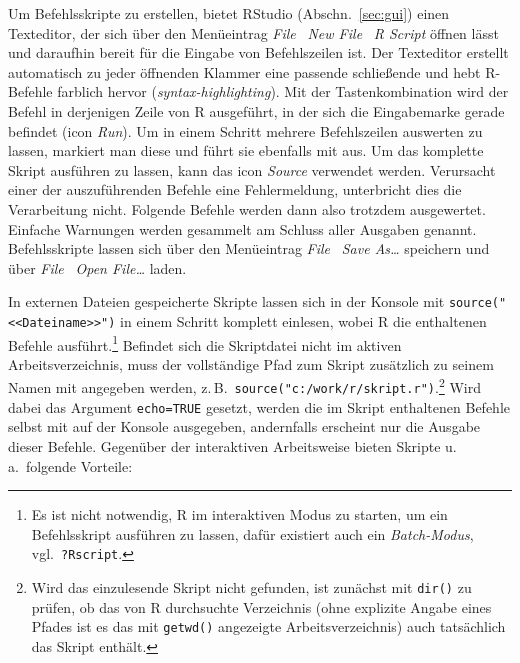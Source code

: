 Um Befehlsskripte zu erstellen, bietet RStudio (Abschn.\ \ref{sec:gui}) einen Texteditor, der sich über den Menüeintrag \emph{File} \textrightarrow\ \emph{New File} \textrightarrow\ \emph{R Script} öffnen lässt und daraufhin bereit für die Eingabe von Befehlszeilen ist. Der Texteditor erstellt automatisch zu jeder öffnenden Klammer eine passende schließende und hebt R-Befehle farblich hervor (\emph{syntax-highlighting}). Mit der Tastenkombination  wird der Befehl in derjenigen Zeile von R ausgeführt, in der sich die Eingabemarke gerade befindet (icon \emph{Run}). Um in einem Schritt mehrere Befehlszeilen auswerten zu lassen, markiert man diese und führt sie ebenfalls mit  aus. Um das komplette Skript ausführen zu lassen, kann das icon \emph{Source} verwendet werden. Verursacht einer der auszuführenden Befehle eine Fehlermeldung, unterbricht dies die Verarbeitung nicht. Folgende Befehle werden dann also trotzdem ausgewertet. Einfache Warnungen werden gesammelt am Schluss aller Ausgaben genannt. Befehlsskripte lassen sich über den Menüeintrag \emph{File} \textrightarrow\ \emph{Save As\ldots} speichern und über \emph{File} \textrightarrow\ \emph{Open File\ldots} laden.

In externen Dateien gespeicherte Skripte lassen sich in der Konsole mit \lstinline!source("<<Dateiname>>")! in einem Schritt komplett einlesen, wobei R die enthaltenen Befehle ausführt.\footnote{Es ist nicht notwendig, R im interaktiven Modus zu starten, um ein Befehlsskript ausführen zu lassen, dafür existiert auch ein \emph{Batch-Modus}, vgl.\ \lstinline!?Rscript!.} Befindet sich die Skriptdatei nicht im aktiven Arbeitsverzeichnis, muss der vollständige Pfad zum Skript zusätzlich zu seinem Namen mit angegeben werden, z.\,B.\ \lstinline!source("c:/work/r/skript.r")!.\footnote{Wird das einzulesende Skript nicht gefunden, ist zunächst mit \lstinline!dir()! zu prüfen, ob das von R durchsuchte Verzeichnis (ohne explizite Angabe eines Pfades ist es das mit \lstinline!getwd()! angezeigte Arbeitsverzeichnis) auch tatsächlich das Skript enthält.} Wird dabei das Argument \lstinline!echo=TRUE! gesetzt, werden die im Skript enthaltenen Befehle selbst mit auf der Konsole ausgegeben, andernfalls erscheint nur die Ausgabe dieser Befehle. Gegenüber der interaktiven Arbeitsweise bieten Skripte u.\,a.\ folgende Vorteile:

